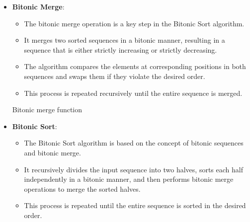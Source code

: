\begin{itemize}
  \item \textbf{Bitonic Merge}:
  \begin{itemize}
    \item The bitonic merge operation is a key step in the Bitonic Sort algorithm.
    \item It merges two sorted sequences in a bitonic manner, resulting in a sequence that is either strictly increasing or strictly decreasing.
    \item The algorithm compares the elements at corresponding positions in both sequences and swaps them if they violate the desired order.
    \item This process is repeated recursively until the entire sequence is merged.
  \end{itemize}

  \begin{center}
    \begin{algorithm}[H]
        
        
        \caption{Bitonic merge function}
    \end{algorithm}
\end{center}
  
  \item \textbf{Bitonic Sort}:
  \begin{itemize}
    \item The Bitonic Sort algorithm is based on the concept of bitonic sequences and bitonic merge.
    \item It recursively divides the input sequence into two halves, sorts each half independently in a bitonic manner, and then performs bitonic merge operations to merge the sorted halves.
    \item This process is repeated until the entire sequence is sorted in the desired order.
  \end{itemize}


\end{itemize}
